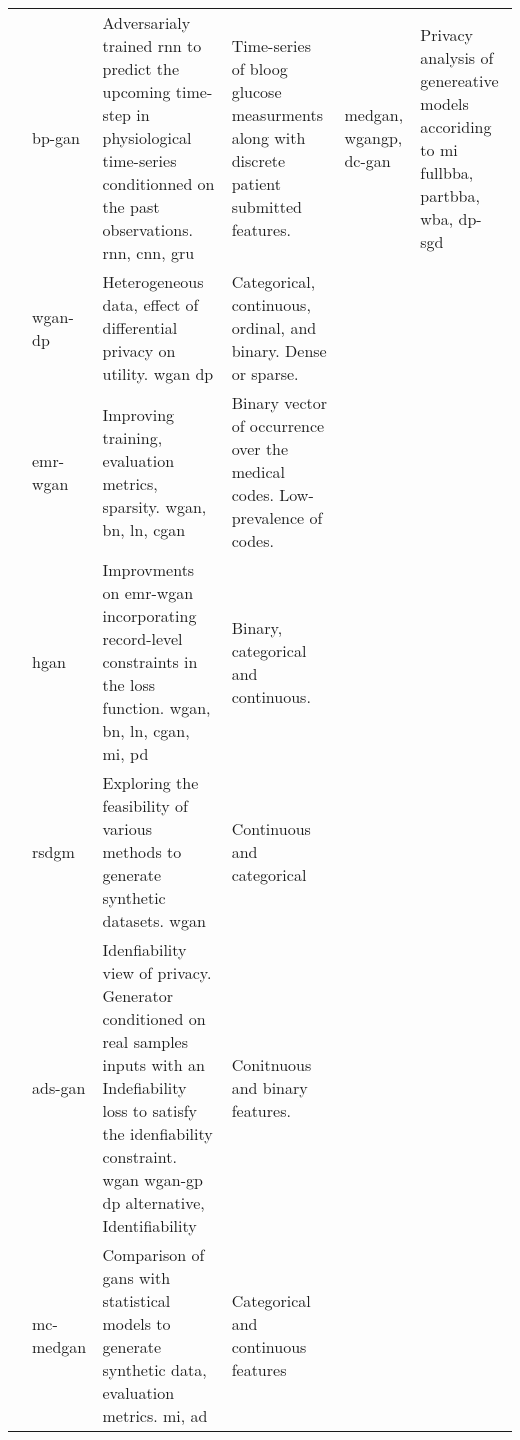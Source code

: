 \begin{sidewaystable}[htbp]
\begin{tabularx}{\textwidth}{@{}p{4cm}XXX@{}}
            
            \cite{zhu_2020}
            & \gls{bp-gan}
            & Adversarialy trained \gls{rnn} to predict the upcoming time-step in physiological time-series conditionned on the past observations. \gls{rnn}, \gls{cnn}, \gls{gru}
            & Time-series of bloog glucose measurments along with discrete patient submitted features.
            
            \cite{chen2019ganleaks}
            & \gls{medgan}, \gls{wgangp}, \gls{dc-gan}
            & Privacy analysis of genereative models accoriding to \gls{mi} \gls{fullbba}, \gls{partbba}, \gls{wba}, \gls{dp-sgd}
            &\\
            
            
            \cite{chincheong2020generation}
            &  \gls{wgan-dp}
            & Heterogeneous data, effect of differential privacy on utility. \gls{wgan} \gls{dp}
            & Categorical, continuous,  ordinal, and binary. Dense or sparse.\\
            
            \cite{Zhang2020}
            &\gls{emr-wgan}
            & Improving training, evaluation metrics, sparsity. \gls{wgan}, \gls{bn}, \gls{ln}, \gls{cgan}
            & Binary vector of occurrence over the medical codes. Low-prevalence of codes. \\
            
            \cite{yan2020generating}
            & \gls{hgan}
            & Improvments on \gls{emr-wgan} incorporating record-level constraints in the loss function.  \gls{wgan}, \gls{bn}, \gls{ln}, \gls{cgan}, \gls{mi}, \gls{pd}
            & Binary, categorical and continuous.\\
            
            \cite{ozyigit2020generation}
            & \gls{rsdgm}
            & Exploring the feasibility of various methods to generate synthetic datasets. \gls{wgan}
            & Continuous and categorical\\
            
            \cite{Yoon2020-anon}
            & \gls{ads-gan}
            & Idenfiability view of privacy. Generator conditioned on real samples inputs with an Indefiability loss to satisfy the idenfiability constraint. \gls{wgan} \gls{wgan-gp} \gls{dp} alternative, Identifiability
            & Conitnuous and binary features.\\
            
            \cite{Goncalves2020}
            & \gls{mc-medgan}
            & Comparison of \glspl{gan} with statistical models to generate synthetic data, evaluation metrics. \gls{mi}, \gls{ad}
            & Categorical and continuous features\\
            
            
            \bottomrule
        \end{tabularx}
    \end{sidewaystable}